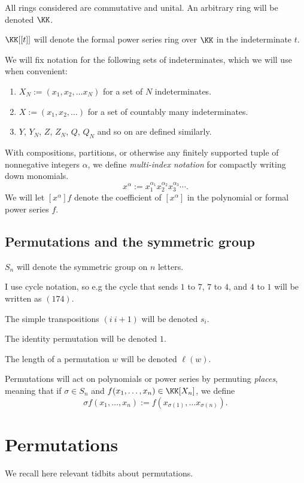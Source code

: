 \documentclass{article}
\begin{document}
All rings considered are commutative and unital. An arbitrary ring will be denoted $\KK$. 

$\KK[[t]]$ will denote the formal power series ring over $\KK$ in the indeterminate $t$.

We will fix notation for the following sets of indeterminates, which we will use when convenient:
\begin{enumerate}[label=(\alph*)]
    \item $X_N := (x_1, x_2, \ldots x_N)$ for a set of $N$ indeterminates.
    \item $X := (x_1, x_2, \ldots)$ for a set of countably many indeterminates.
    \item $Y$, $Y_N$, $Z$, $Z_N$, $Q$, $Q_N$ and so on are defined similarly.
\end{enumerate}

With compositions, partitions, or otherwise any finitely supported tuple of nonnegative integers $\alpha$, we define \textit{multi-index notation} for compactly writing down monomials.
\[
    x^\alpha := x_1^{\alpha_1}x_2^{\alpha_2}x_3^{\alpha_3}\cdots.
\]
We will let $[x^\alpha]f$ denote the coefficient of $[x^\alpha]$ in the polynomial or formal power series $f$.

\subsection{Permutations and the symmetric group}

$S_n$ will denote the symmetric group on $n$ letters.

I use cycle notation, so e.g the cycle that sends $1$ to $7$, $7$ to $4$, and $4$ to $1$ will be written as $(174)$.

The simple transpositions $(i\:i+1)$ will be denoted $s_i$.

The identity permutation will be denoted $1$.

The length of a permutation $w$ will be denoted $\ell(w)$.

Permutations will act on polynomials or power series by permuting \textit{places}, meaning that if $\sigma \in S_n$ and $f(x_1, \ldots, x_n) \in \KK[X_n]$, we define
\[
    \sigma f(x_1, \ldots, x_n) := f(x_{\sigma(1)}, \ldots x_{\sigma(n)}).
\]

\section{Permutations}

We recall here relevant tidbits about permutations. 
\end{document}
